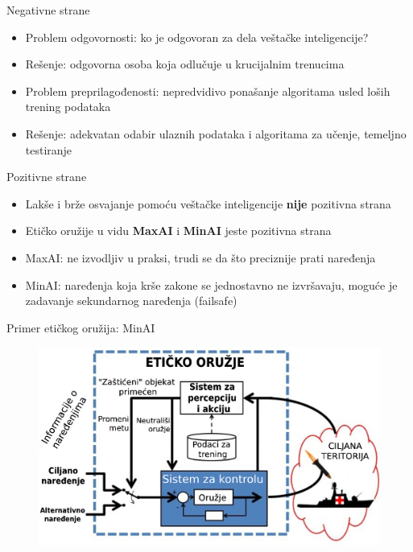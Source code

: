 \documentclass[14pt, aspectratio=169]{beamer}
\begin{document}
\begin{frame}{Negativne strane}
    \begin{itemize}
        \item Problem odgovornosti: ko je odgovoran za dela veštačke inteligencije?
        \item Rešenje: odgovorna osoba koja odlučuje u krucijalnim trenucima
        \item Problem preprilagođenosti: nepredvidivo ponašanje algoritama usled loših trening podataka
        \item Rešenje: adekvatan odabir ulaznih podataka i algoritama za učenje, temeljno testiranje
    \end{itemize}
\end{frame}

\begin{frame}{Pozitivne strane}
    \begin{itemize}
        \item Lakše i brže osvajanje pomoću veštačke inteligencije \textbf{nije} pozitivna strana
        \item Etičko oružije u vidu \textbf{MaxAI} i \textbf{MinAI} jeste pozitivna strana
        \item MaxAI: ne izvodljiv u praksi, trudi se da što preciznije prati naređenja
        \item MinAI: naređenja koja krše zakone se jednostavno ne izvršavaju, moguće je zadavanje sekundarnog naređenja (failsafe)
    \end{itemize}    
\end{frame}

\begin{frame}{Primer etičkog oružija: MinAI}
    \begin{figure}[h!]
        \begin{center}
            \includegraphics[scale=0.205]{minAI_slideovi.jpg}
        \end{center}
        \label{fig:minAI}
    \end{figure}
\end{frame}
\end{document}
